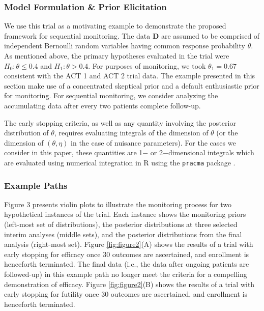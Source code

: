 \documentclass[12pt]{article}
\begin{document}
\subsubsection{Model Formulation \& Prior Elicitation}\label{sec:example1model} We use this trial as a motivating example to demonstrate the proposed 
framework for sequential monitoring. The data $\mathbf{D}$ are assumed to be comprised of independent Bernoulli random variables having common response 
probability $\theta$. 
%
As mentioned above, the primary hypotheses evaluated in the trial were $H_0:\theta \le 0.4$ and $H_1: \theta>0.4$.
%
For purposes of monitoring, we took $\theta_1=0.67$ consistent with the ACT 1 and ACT 2 trial data. 
%
The example presented in this section make use of a concentrated skeptical prior and a default enthusiastic prior for monitoring.
%
%
%
For sequential monitoring, we consider analyzing the accumulating data after every two patients complete follow-up.

The early stopping criteria, as well as any quantity involving the posterior distribution of $\theta$, requires evaluating integrals of the dimension of $\theta$ (or the dimension of $(\theta,\eta)$ in the case of nuisance parameters).
%
For the cases we consider in this paper, these quantities are 1$-$ or 2$-$dimensional integrals which are evaluated using numerical integration in R \citep{R2017} using the \texttt{pracma} package \citep{Borchers2019}.

\subsubsection{Example Paths}
Figure 3 presents violin plots to illustrate the monitoring process for two hypothetical instances of the trial. 
%
Each instance shows the monitoring priors (left-most set of distributions), the posterior distributions at three selected interim analyses (middle sets), and the posterior distributions from the final analysis (right-most set).
Figure \ref{fig:figure2}(A) shows the results of a trial with early stopping for efficacy once 30 outcomes are ascertained, and enrollment is henceforth terminated. 
%
The final data (i.e., the data after ongoing patients are followed-up) in this example path no longer meet the criteria for a compelling demonstration of efficacy.
%
Figure \ref{fig:figure2}(B) shows the results of a trial with early stopping for futility once 30 outcomes are ascertained, and enrollment is henceforth terminated. %
\end{document}
